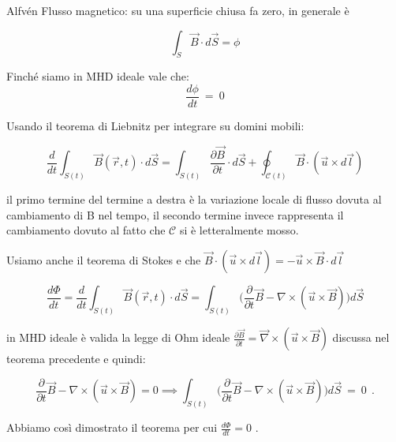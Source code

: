 \begin{teorema}{Alfvén}{}
	Flusso magnetico: su una superficie chiusa fa zero, in generale è 
	
	\[\int_S\vec B\cdot d\vec S=\phi\] 
	
	Finché siamo in MHD ideale vale che:
	\[ \boxed{\ \frac{d\phi}{dt}\ =\ 0\ }\]  
	
	Usando il teorema di Liebnitz per integrare su domini mobili:
	
	\[\frac{d}{dt}\int_{S(t)}\vec B(\vec r,t)\cdot d\vec S=\int_{S(t)}\frac{\partial \vec B}{\partial t}\cdot d\vec S+\oint_{\mathcal{C}(t)}\vec B\cdot (\vec u\times d\vec l)\] 
	
	il primo termine del termine a destra è la variazione locale di flusso dovuta al cambiamento di B nel tempo, il secondo termine invece rappresenta il cambiamento dovuto al fatto che $\mathcal{C}$ si è letteralmente mosso. 
	
	Usiamo anche il teorema di Stokes e che $\vec B\cdot (\vec u\times d\vec l)=-\vec u\times \vec B\cdot d\vec l$
	
	\[\frac{d\Phi}{dt} = \frac{d}{dt}\int_{S(t)}\vec B(\vec r,t)\cdot d\vec S=\int_{S(t)}\bigg(\frac{\partial}{\partial t}\vec B-\nabla\times(\vec u\times \vec B)\bigg)d\vec S\]  
	
	in MHD ideale è valida la legge di Ohm ideale $\frac{\partial\vec B}{\partial t}=\vec \nabla\times(\vec u\times\vec B)$ discussa nel teorema precedente e quindi: 
	
	\[\frac{\partial}{\partial t}\vec B-\nabla\times(\vec u\times \vec B)=0\implies\int_{S(t)}\bigg(\frac{\partial}{\partial t}\vec B-\nabla\times(\vec u\times \vec B)\bigg)d\vec S\ =\ 0\ \ .\]  
	
	Abbiamo così dimostrato il teorema per cui $\boxed{\frac{d\Phi}{dt} = 0}$ .
\end{teorema}
